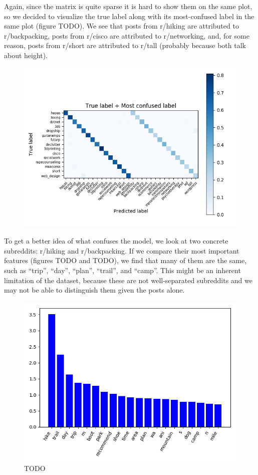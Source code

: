 \documentclass{sig-alternate-05-2015}
\begin{document}
Again, since the matrix is quite sparse it is hard to show them on the same plot, so we decided to visualize the true label along with its most-confused label in the same plot (figure TODO). We see that posts from r/hiking are attributed to r/backpacking, posts from r/cisco are attributed to r/networking, and, for some reason, posts from r/short are attributed to r/tall (probably because both talk about height).

\begin{figure}[H]
\centering
\includegraphics[width=\linewidth]{../plots/confusion-matrix-true-label-vs-most-confused-label.png}
\caption{}
\end{figure}

To get a better idea of what confuses the model, we look at two concrete subreddits: r/hiking and r/backpacking. If we compare their most important features (figures TODO and TODO), we find that many of them are the same, such as ``trip'', ``day'', ``plan'', ``trail'', and ``camp''. This might be an inherent limitation of the dataset, because these are not well-separated subreddits and we may not be able to distinguish them given the posts alone.

\begin{figure}[H]
\centering
\includegraphics[width=\linewidth]{../coefficients-hiking-dim-393.png}
\caption{TODO}
\end{figure}
\end{document}
